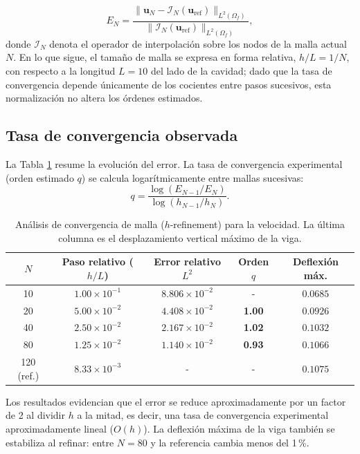 \documentclass[12pt, letterpaper]{report}
\theoremstyle{definition}
\begin{document}
\begin{equation}
    E_N = \frac{\| \mathbf{u}_N - \mathcal{I}_N(\mathbf{u}_{\text{ref}}) \|_{L^2(\Omega_f)}}{\| \mathcal{I}_N(\mathbf{u}_{\text{ref}}) \|_{L^2(\Omega_f)}},
\end{equation}
donde $\mathcal{I}_N$ denota el operador de interpolación sobre los nodos de la malla actual $N$. En lo que sigue, el tamaño de malla se expresa en forma relativa, $h/L = 1/N$, con respecto a la longitud $L = 10$ del lado de la cavidad; dado que la tasa de convergencia depende únicamente de los cocientes entre pasos sucesivos, esta normalización no altera los órdenes estimados.

\subsection{Tasa de convergencia observada}

La Tabla \ref{tab:convergencia} resume la evolución del error. La tasa de convergencia experimental (orden estimado $q$) se calcula logarítmicamente entre mallas sucesivas:
\[
q = \frac{\log(E_{N-1} / E_N)}{\log(h_{N-1} / h_N)}.
\]

\begin{table}[H]
\centering
\renewcommand{\arraystretch}{1.2}
\small
\begin{tabular}{|c|c|c|c|c|}
    \hline
    \textbf{$N$} & \textbf{Paso relativo ($h/L$)} & \textbf{Error relativo $L^2$} & \textbf{Orden $q$} & \textbf{Deflexión máx.} \\ \hline
    10 & $1.00 \times 10^{-1}$ & $8.806 \times 10^{-2}$ & - & $0.0685$ \\ \hline
    20 & $5.00 \times 10^{-2}$ & $4.408 \times 10^{-2}$ & \textbf{1.00} & $0.0926$ \\ \hline
    40 & $2.50 \times 10^{-2}$ & $2.167 \times 10^{-2}$ & \textbf{1.02} & $0.1032$ \\ \hline
    80 & $1.25 \times 10^{-2}$ & $1.140 \times 10^{-2}$ & \textbf{0.93} & $0.1066$ \\ \hline
    120 (ref.) & $8.33 \times 10^{-3}$ & - & - & $0.1075$ \\ \hline
\end{tabular}
\caption{Análisis de convergencia de malla ($h$-refinement) para la velocidad. La última columna es el desplazamiento vertical máximo de la viga.}
\label{tab:convergencia}
\end{table}

Los resultados evidencian que el error se reduce aproximadamente por un factor de 2 al dividir $h$ a la mitad, es decir, una tasa de convergencia experimental aproximadamente lineal ($O(h)$). La deflexión máxima de la viga también se estabiliza al refinar: entre $N = 80$ y la referencia cambia menos del 1\,\%.
\end{document}
